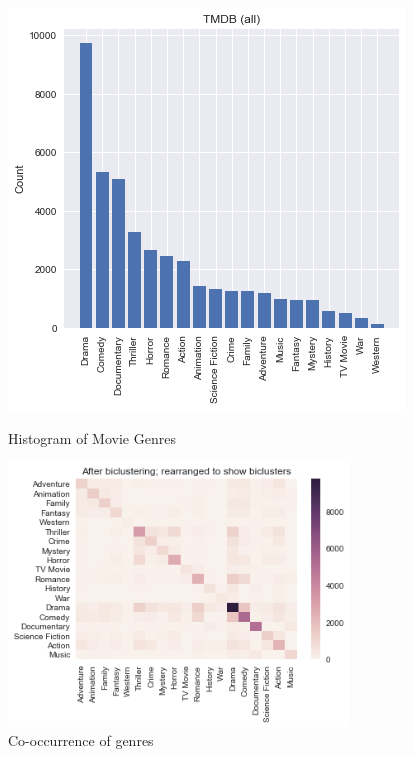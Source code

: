 \documentclass[12pt]{article} %
\begin{document}
\begin{figure}[H]
\centering
\begin{minipage}{0.5\textwidth}
  \centering
  \includegraphics[width=\linewidth]{count.png}
  \caption{Histogram of Movie Genres}
  \label{fig:hist}
\end{minipage}%
\begin{minipage}{0.5\textwidth}
  \centering
  \includegraphics[width=\linewidth,height=7cm]{coappear.png}
  \caption{Co-occurrence of genres}
  \label{fig:co-occurrence}
\end{minipage}%
\end{figure}
\end{document}
